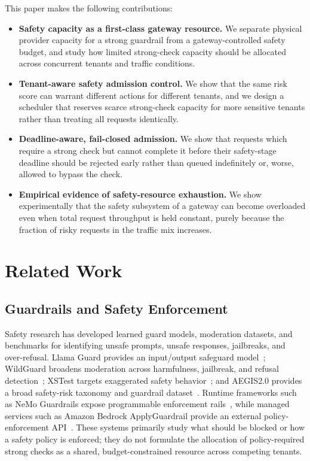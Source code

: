 \documentclass[conference]{IEEEtran}
\begin{document}
This paper makes the following contributions:
\begin{itemize}
\item \textbf{Safety capacity as a first-class gateway resource.} We separate physical provider capacity for a strong guardrail from a gateway-controlled safety budget, and study how limited strong-check capacity should be allocated across concurrent tenants and traffic conditions.
\item \textbf{Tenant-aware safety admission control.} We show that the same risk score can warrant different actions for different tenants, and we design a scheduler that reserves scarce strong-check capacity for more sensitive tenants rather than treating all requests identically.
\item \textbf{Deadline-aware, fail-closed admission.} We show that requests which require a strong check but cannot complete it before their safety-stage deadline should be rejected early rather than queued indefinitely or, worse, allowed to bypass the check.
\item \textbf{Empirical evidence of safety-resource exhaustion.} We show experimentally that the safety subsystem of a gateway can become overloaded even when total request throughput is held constant, purely because the fraction of risky requests in the traffic mix increases.
\end{itemize}

\section{Related Work}

\subsection{Guardrails and Safety Enforcement}

Safety research has developed learned guard models, moderation datasets, and benchmarks for identifying unsafe prompts, unsafe responses, jailbreaks, and over-refusal. Llama Guard provides an input/output safeguard model~\cite{inan2023llamaguard}; WildGuard broadens moderation across harmfulness, jailbreak, and refusal detection~\cite{han2024wildguard}; XSTest targets exaggerated safety behavior~\cite{rottger2024xstest}; and AEGIS2.0 provides a broad safety-risk taxonomy and guardrail dataset~\cite{ghosh2025aegis2}. Runtime frameworks such as NeMo Guardrails expose programmable enforcement rails~\cite{rebedea2023nemo}, while managed services such as Amazon Bedrock ApplyGuardrail provide an external policy-enforcement API~\cite{aws_applyguardrail}. These systems primarily study what should be blocked or how a safety policy is enforced; they do not formulate the allocation of policy-required strong checks as a shared, budget-constrained resource across competing tenants.
\end{document}
